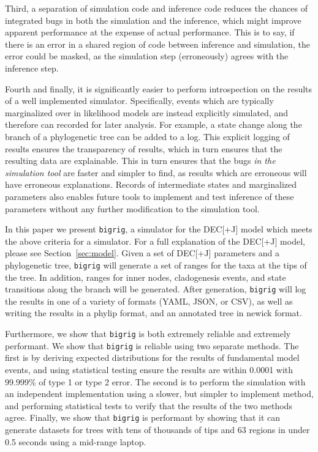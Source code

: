 \documentclass[a4paper]{article}
\newcommand{\bigrig}{\texttt{bigrig}}
\newcommand{\decj}{DEC[+J]}
\begin{document}
Third, a separation of simulation code and inference code reduces the chances of integrated bugs in both the simulation
and the inference, which might improve apparent performance at the expense of actual performance.
This is to say, if there is an error in a shared region of code between inference and simulation, the error could be
masked, as the simulation step (erroneously) agrees with the inference step.

Fourth and finally, it is significantly easier to perform introspection on the results of a well implemented simulator.
Specifically, events which are typically marginalized over in likelihood models are instead explicitly simulated, and
therefore can recorded for later analysis.
For example, a state change along the branch of a phylogenetic tree can be added to a log.
This explicit logging of results ensures the transparency of results, which in turn ensures that the resulting data are
explainable.
This in turn ensures that the bugs \textit{in the simulation tool} are faster and simpler to find, as results which are
erroneous will have erroneous explanations.
Records of intermediate states and marginalized parameters also enables future tools to implement and test inference of
these parameters without any further modification to the simulation tool.

In this paper we present \bigrig{}, a simulator for the \decj{}  model
which meets the above criteria for a simulator. For a full explanation of the \decj{} model, please see
Section~\ref{sec:model}.
Given a set of \decj{} parameters and a phylogenetic tree, \bigrig{} will generate a set of ranges for the taxa at the
tips of the tree.
In addition, ranges for inner nodes, cladogenesis events, and state transitions along the branch will be generated.
After generation, \bigrig{} will log the results in one of a variety of formats (YAML, JSON, or CSV), as well as writing
the results in a phylip format, and an annotated tree in newick format.

Furthermore, we show that \bigrig{} is both extremely reliable and extremely performant.
We show that \bigrig{} is reliable using two separate methods.
The first is by deriving expected distributions for the results of fundamental model events, and using statistical
testing ensure the results are within 0.0001 with 99.999\% of type 1 or type 2 error.
The second is to perform the simulation with an independent implementation using a slower, but simpler to implement
method, and performing statistical tests to verify that the results of the two methods agree.
Finally, we show that \bigrig{} is performant by showing that it can generate datasets for trees with tens of thousands
of tips and 63 regions in under 0.5  seconds using a mid-range laptop.
\end{document}
